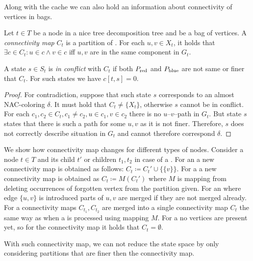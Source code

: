 Along with the cache we can also hold an information about connectivity of
vertices in bags.
%
\begin{definition}
	Let \( t \in T \) be a node in a nice tree decomposition tree and
	\Xt{} be a bag of vertices.
	A \emph{connectivity map} \( C_t \) is a partition of \Xt{}.
	For each \( u, v \in X_t \), it holds that
	\( \exists c \in C_t : u \in c \land v \in c \) iff
	\( u, v \) are in the same component in \( G_t \).
\end{definition}
%
\begin{lemma}
	A state \( s \in S_t \) is \emph{in conflict} with \( C_t \)
	if both \( P_{\text{red}} \) and \( P_{\text{blue}} \) are not same or finer that \( C_t \).
	For such states we have \( c[t, s] = 0 \).
\end{lemma}
%
\begin{proof}
	For contradiction, suppose that such state \( s \)
	corresponds to an almost NAC-coloring \( \delta \).
	It must hold that \( C_t \ne \{X_t\} \), otherwise \( s \) cannot be in conflict.
	For each \( c_1, c_2 \in C_t, c_1 \ne c_2, u \in c_1, v \in c_2 \)
	there is no \( u \)--\( v \)--path in \( G_t \).
	But state \( s \) states that there is such a path for some \( u, v \) as it is not finer.
	Therefore, \( s \) does not correctly describe situation in \( G_t \)
	and cannot therefore correspond \( \delta \).
\end{proof}
%
We show how connectivity map changes for different types of nodes.
Consider a node \( t \in T \) and its child \( t' \)
or children \( t_1, t_2 \) in case of a \JoinNode{}.
%
For an \IntroduceVertexNode{}
a new connectivity map is obtained as follows:
\( C_t \coloneqq C_t' \cup \{\{ v \}\} \).
%
For a \ForgetVertexNode{}
a new connectivity map is obtained as
\( C_t \coloneqq M(C_t') \)
where \( M \) is mapping from 
deleting occurrences of forgotten vertex from the partition given.
%
For an \IntroduceEdgeNode{}
where edge \( \{u, v\} \) is introduced
parts of \( u, v \) are merged if they are not merged already.
%
For a \JoinNode{}
connectivity maps \( C_{t_1}, C_{t_2} \) are merged into
a single connectivity map \( C_t \)
the same way as when a \JoinNode{} is processed using mapping \( M \).
%
For a \LeafNode{}
no vertices are present yet, so for the connectivity map it holds that \( C_t = \emptyset \).

With such connectivity map, we can not reduce the state space by only considering
partitions that are finer then the connectivity map.


